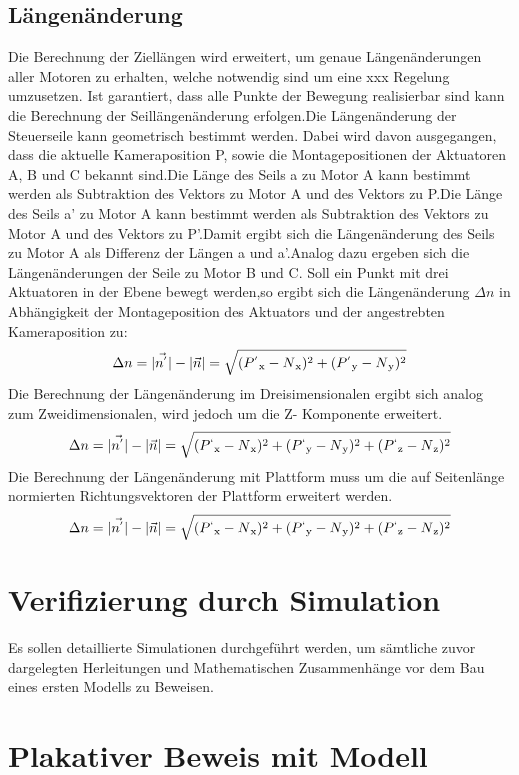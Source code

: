 \documentclass[12pt,titlepage]{article}
\begin{document}
		\subsection{Längenänderung}
			Die Berechnung der Ziellängen wird erweitert, um genaue Längenänderungen aller Motoren zu erhalten, welche notwendig sind um eine xxx Regelung umzusetzen.
			Ist garantiert, dass alle Punkte der Bewegung realisierbar sind kann die Berechnung der Seillängenänderung erfolgen.Die Längenänderung der Steuerseile kann geometrisch bestimmt werden.
			Dabei wird davon ausgegangen, dass die aktuelle Kameraposition P, sowie die Montagepositionen der Aktuatoren A, B und C bekannt sind.Die Länge des Seils a zu Motor A kann bestimmt werden als Subtraktion des Vektors zu Motor A und des Vektors zu P.Die Länge des Seils a' zu Motor A kann bestimmt werden als Subtraktion des Vektors zu Motor A und des Vektors zu P'.Damit ergibt sich die Längenänderung des Seils zu Motor A als Differenz der Längen a und a'.Analog dazu ergeben sich die Längenänderungen der Seile zu Motor B und C.
			Soll ein Punkt mit drei Aktuatoren in der Ebene bewegt werden,so ergibt sich die Längenänderung $\Delta n$ in Abhängigkeit der Montageposition des Aktuators und der angestrebten Kameraposition zu:
			\begin{align}
				\Delta n =
				|\vec{n^{'}}|-|\vec{n}|=
				\sqrt	{
						(P^{'}\textsubscript{x}-N\textsubscript{x})^2+
						(P^{'}\textsubscript{y}-N\textsubscript{y})^2
						}
			\end{align}
			Die Berechnung der Längenänderung im Dreisimensionalen ergibt sich analog zum Zweidimensionalen, wird jedoch um die Z- Komponente erweitert.
			\begin{align}
				\Delta n =
				|\vec{n^{'}}|-|\vec{n}|=
				\sqrt	{
						(P^{`}\textsubscript{x}-N\textsubscript{x})^2+
						(P^{`}\textsubscript{y}-N\textsubscript{y})^2+
						(P^{`}\textsubscript{z}-N\textsubscript{z})^2
						}
			\end{align}	
			Die Berechnung der Längenänderung mit Plattform muss um die auf Seitenlänge normierten Richtungsvektoren der Plattform erweitert werden.
			\begin{align}
				\Delta n =
				|\vec{n^{'}}|-|\vec{n}|=
				\sqrt	{
						(P^{`}\textsubscript{x}-N\textsubscript{x})^2+
						(P^{`}\textsubscript{y}-N\textsubscript{y})^2+
						(P^{`}\textsubscript{z}-N\textsubscript{z})^2
						}
			\end{align}
			\pagebreak
	\section{Verifizierung durch Simulation}
	Es sollen detaillierte Simulationen durchgeführt werden, um sämtliche zuvor dargelegten Herleitungen und Mathematischen Zusammenhänge vor dem Bau eines ersten Modells zu Beweisen.
	\section{Plakativer Beweis mit Modell}
\end{document}
